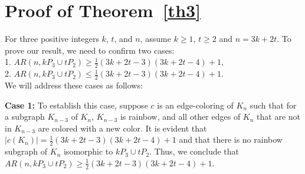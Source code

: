 \documentclass[12pt]{article}
\begin{document}
\section{Proof of Theorem~\ref{th3}}
For three positive integers \( k \), \( t \), and \( n \), assume $k\geq1$, \( t \geq 2 \) and \( n = 3k + 2t \). To prove our result, we need to confirm two cases: \\
1. \( AR(n, kP_3 \cup tP_2) \geq \frac{1}{2}(3k + 2t - 3)(3k + 2t - 4) + 1 \),\\
2. \( AR(n, kP_3 \cup tP_2) \leq \frac{1}{2}(3k + 2t - 3)(3k + 2t - 4) + 1 \).\\
We will address these cases as follows:

\noindent
{\bf Case 1:} To establish this case, suppose \( c \) is an edge-coloring of \( K_n \) such that for a subgraph \( K_{n-3} \) of \( K_n \), \( K_{n-3} \) is rainbow, and all other edges of \( K_n \) that are not in \( K_{n-3} \) are colored with a new color. It is evident that \( |c(K_n)| = \frac{1}{2}(3k + 2t - 3)(3k + 2t - 4) + 1 \) and that there is no rainbow subgraph of \( K_n \) isomorphic to \( kP_3 \cup tP_2 \). Thus, we conclude that \( AR(n, kP_3 \cup tP_2) \geq \frac{1}{2}(3k + 2t - 3)(3k + 2t - 4) + 1 \).
\end{document}
